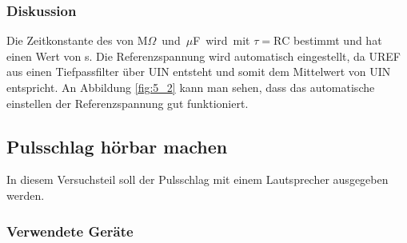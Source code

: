 \documentclass[12pt,a4paper]{article}
\begin{document}
\subsubsection*{Diskussion}

Die Zeitkonstante des von \unit[10]{M$\Omega$} und \unit[0,1]{$\mu$F} wird mit $\tau = \text{RC}$ bestimmt und hat einen Wert von \unit[1]{s}. Die Referenzspannung wird automatisch eingestellt, da UREF aus einen Tiefpassfilter über UIN entsteht und somit dem Mittelwert von UIN entspricht. An Abbildung \ref{fig:5_2} kann man sehen, dass das automatische einstellen der Referenzspannung gut funktioniert.



\subsection{Pulsschlag hörbar machen}

In diesem Versuchsteil soll der Pulsschlag mit einem Lautsprecher ausgegeben werden.

\subsubsection*{Verwendete Geräte}
\end{document}
